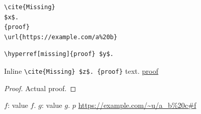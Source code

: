 \begin{verbatim}
\cite{Missing}
$x$.
{proof}
\url{https://example.com/a%20b}
\end{verbatim}
\begin{lstlisting}
\hyperref[missing]{proof} $y$.
\end{lstlisting}
Inline \verb|\cite{Missing} $z$. {proof}| text.
\hyperref[testFamily]{proof}
\begin{proof}
Actual proof.
\end{proof}
$f$: value
$f$.
\(g\): value
\(g\).
$p$%
\url{https://example.com/~u/a_b%20c#f}
\cite[see][p.~4]{Cauchy1815}
